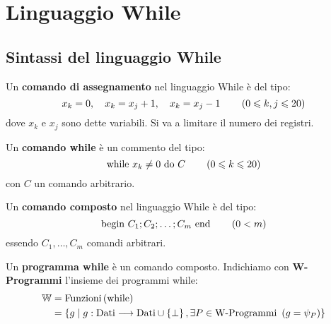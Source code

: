 \documentclass{lectures}
\begin{document}
\section{Linguaggio While}
\subsection{Sintassi del linguaggio While}
\begin{multicols}{2}
    \begin{definition}
        Un \textbf{comando di assegnamento} nel linguaggio While è del tipo:
        \[
            x_k = 0,\quad x_k=x_j+1,\quad x_k=x_j-1 \qquad \left(0 \leqslant k, j \leqslant 20\right)
        \]
        dove \(x_k\) e \(x_j\) sono dette variabili. Si va a limitare il numero dei registri.
    \end{definition}
    \begin{definition}
        Un \textbf{comando while} è un commento del tipo:
        \[
            \text{while }x_k\neq 0 \text{ do }C\qquad \left(0\leqslant k\leqslant 20\right)
        \]
        con \(C\) un comando arbitrario.
    \end{definition}
    \begin{definition}
        Un \textbf{comando composto} nel linguaggio While è del tipo:
        \[
            \text{begin }C_1;C_2;\ldots;C_m\text{ end} \qquad \left(0<m\right)
        \]
        essendo \(C_1,\ldots,C_m\) comandi arbitrari.
    \end{definition}
    \begin{definition}
        Un \textbf{programma while} è un comando composto. Indichiamo con \textbf{W-Programmi} l'insieme dei programmi while:
        \begin{align*}
            \mathbb{W} &= \text{Funzioni}\left(\text{while}\right)\\ &= \left\{g\mid g:\text{Dati}\longrightarrow \text{Dati}\cup \left\{\bot\right\}, \exists P \in \text{W-Programmi }\left(g = \psi_P\right)\right\}
        \end{align*}
    \end{definition}
\end{multicols}
\end{document}
